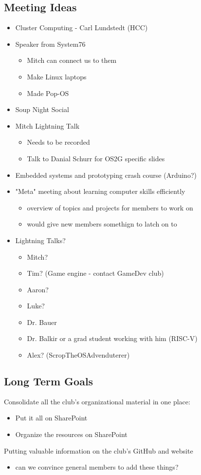 \subsection{Meeting Ideas}
\begin{itemize}
    \item Cluster Computing - Carl Lundstedt (HCC)
    \item Speaker from System76
    \begin{itemize}
        \item Mitch can connect us to them
        \item Make Linux laptops
        \item Made Pop-OS
    \end{itemize}
    \item Soup Night Social
    \item Mitch Lightning Talk
    \begin{itemize}
        \item Needs to be recorded
        \item Talk to Danial Schurr for OS2G specific slides
    \end{itemize}
    \item Embedded systems and prototyping crash course (Arduino?)
    \item "Meta" meeting about learning computer skills efficiently
    \begin{itemize}
        \item overview of topics and projects for members to work on
        \item would give new members somethign to latch on to
    \end{itemize}
    \item Lightning Talks?
    \begin{itemize}
        \item Mitch?
        \item Tim? (Game engine - contact GameDev club)
        \item Aaron?
        \item Luke?
        \item Dr. Bauer
        \item Dr. Balkir or a grad student working with him (RISC-V)
        \item Alex? (ScropTheOSAdvenduterer)
    \end{itemize}
\end{itemize}

\subsection{Long Term Goals}
Consolidate all the club's organizational material in one place:
\begin{itemize}
    \item Put it all on SharePoint
    \item Organize the resources on SharePoint
\end{itemize}
Putting valuable information on the club's GitHub and website 
\begin{itemize}
    \item can we convince general members to add these things?
\end{itemize}

